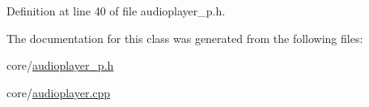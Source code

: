 Definition at line 40 of file audioplayer\+\_\+p.\+h.



The documentation for this class was generated from the following files\+:\begin{DoxyCompactItemize}
\item 
core/\hyperlink{audioplayer__p_8h}{audioplayer\+\_\+p.\+h}\item 
core/\hyperlink{audioplayer_8cpp}{audioplayer.\+cpp}\end{DoxyCompactItemize}
